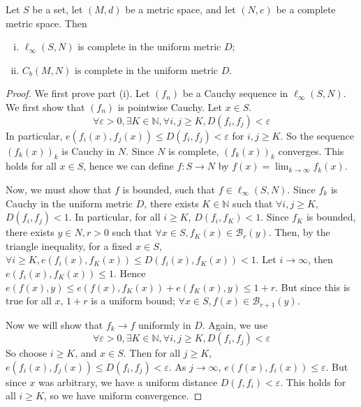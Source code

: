\begin{theorem}
	Let \( S \) be a set, let \( (M,d) \) be a metric space, and let \( (N,e) \) be a complete metric space.
	Then
	\begin{enumerate}[(i)]
		\item \( \ell_\infty(S,N) \) is complete in the uniform metric \( D \);
		\item \( C_b(M,N) \) is complete in the uniform metric \( D \).
	\end{enumerate}
\end{theorem}
\begin{proof}
	We first prove part (i).
	Let \( (f_n) \) be a Cauchy sequence in \( \ell_\infty(S, N) \).
	We first show that \( (f_n) \) is pointwise Cauchy.
	Let \( x \in S \).
	\[
		\forall \varepsilon > 0, \exists K \in \mathbb N, \forall i,j \geq K, D(f_i, f_j) < \varepsilon
	\]
	In particular, \( e(f_i(x), f_j(x)) \leq D(f_i,f_j) < \varepsilon \) for \( i,j \geq K \).
	So the sequence \( (f_k(x))_k \) is Cauchy in \( N \).
	Since \( N \) is complete, \( (f_k(x))_k \) converges.
	This holds for all \( x \in S \), hence we can define \( f \colon S \to N \) by \( f(x) = \lim_{k \to \infty} f_k(x) \).

	Now, we must show that \( f \) is bounded, such that \( f \in \ell_\infty(S,N) \).
	Since \( f_k \) is Cauchy in the uniform metric \( D \), there exists \( K \in \mathbb N \) such that \( \forall i,j \geq K \), \( D(f_i,f_j) < 1 \).
	In particular, for all \( i \geq K \), \( D(f_i,f_K) < 1 \).
	Since \( f_K \) is bounded, there exists \( y \in N, r > 0 \) such that \( \forall x \in S, f_K(x) \in \mathcal B_r(y) \).
	Then, by the triangle inequality, for a fixed \( x \in S \), \( \forall i \geq K, e(f_i(x), f_K(x)) \leq D(f_i(x), f_K(x)) < 1 \).
	Let \( i \to \infty \), then \( e(f_i(x), f_K(x)) \leq 1 \).
	Hence \( e(f(x),y) \leq e(f(x), f_K(x)) + e(f_K(x),y) \leq 1 + r \).
	But since this is true for all \( x \), \( 1 + r \) is a uniform bound; \( \forall x \in S, f(x) \in \mathcal B_{r+1}(y) \).

	Now we will show that \( f_k \to f \) uniformly in \( D \).
	Again, we use
	\[
		\forall \varepsilon > 0, \exists K \in \mathbb N, \forall i,j \geq K, D(f_i, f_j) < \varepsilon
	\]
	So choose \( i \geq K \), and \( x \in S \).
	Then for all \( j \geq K \), \( e(f_i(x), f_j(x)) \leq D(f_i, f_j) < \varepsilon \).
	As \( j \to \infty \), \( e(f(x), f_i(x)) \leq \varepsilon \).
	But since \( x \) was arbitrary, we have a uniform distance \( D(f, f_i) < \varepsilon \).
	This holds for all \( i \geq K \), so we have uniform convergence.


\end{proof}
